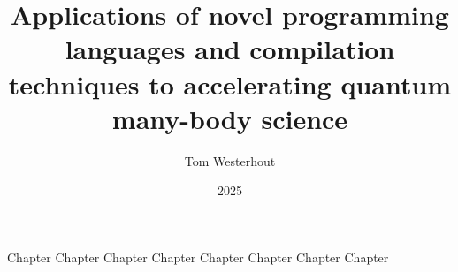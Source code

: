 \documentclass[10pt,a4paper,twoside,openany]{memoir} %
\title{\fontsize{22pt}{22pt}Applications of novel programming languages and compilation techniques to accelerating quantum many-body science}
\author{\fontsize{16pt}{20pt}Tom Westerhout}
\date{2025}
\begin{document}
\mainmatter
\pagestyle{MyFrontStyle}

\begin{titlingpage}
\maketitle
\end{titlingpage}

\pagestyle{MyPageStyle}


% 

\setcounter{page}{5}
\setlength{\beforechapskip}{0pt}
\tableofcontents*
\setlength{\beforechapskip}{50pt}


\openright
{Chapter}
{Chapter}
{Chapter}
{Chapter}
{Chapter}
{Chapter}
{Chapter}
{Chapter}

\backmatter
\openany
\pagestyle{MyBackStyle}
{\footnotesize} 






\end{document}
